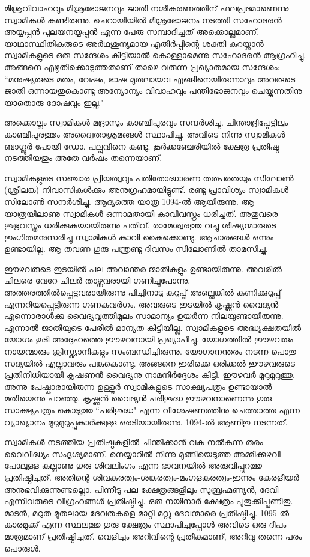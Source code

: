 \documentclass[12pt,openany]{book}
\begin{document}
	മിശ്രവിവാഹവും മിശ്രഭോജനവും ജാതി നശീകരണത്തിന് ഫലപ്രദമാണെന്നു സ്വാമികൾ കണ്ടിരുന്നു. ചെറായിയിൽ മിശ്രഭോജനം നടത്തി സഹോദരൻ അയ്യപ്പൻ പുലയനയ്യപ്പൻ എന്ന പേരു സമ്പാദിച്ചത് അക്കൊല്ലമാണ്. യാഥാസ്ഥിതികരുടെ അർഥശൂന്യമായ എതിർപ്പിന്റെ ശക്തി കുറയ്ക്കാൻ സ്വാമികളുടെ ഒരു സന്ദേശം കിട്ടിയാൽ കൊള്ളാമെന്നു സഹോദരൻ ആഗ്രഹിച്ചു. അങ്ങനെ എഴുതിക്കൊടുത്തതാണ് താഴെ വരുന്ന പ്രഖ്യാതമായ സന്ദേശം: ``മനുഷ്യരുടെ മതം, വേഷം, ഭാഷ മുതലായവ എങ്ങിനെയിരുന്നാലും അവരുടെ ജാതി ഒന്നായതുകൊണ്ടു അന്യോന്യം വിവാഹവും പന്തിഭോജനവും ചെയ്യുന്നതിനു യാതൊരു ദോഷവും ഇല്ല."
	
	അക്കൊല്ലം സ്വാമികൾ മദ്രാസും കാഞ്ചീപുരവും സന്ദർശിച്ചു. ചിന്താദ്രിപ്പേട്ടിലും കാഞ്ചീപുരത്തും അദ്വൈതാശ്രമങ്ങൾ സ്ഥാപിച്ചു. അവിടെ നിന്നു സ്വാമികൾ ബാഗ്ലൂർ പോയി ഡോ. പല്പുവിനെ കണ്ടു. കൂർക്കഞ്ചേരിയിൽ ക്ഷേത്ര പ്രതിഷ്ഠ നടത്തിയതും അതേ വർഷം തന്നെയാണ്.
	
	സ്വാമികളുടെ സഞ്ചാര പ്രിയത്വവും പതിതോദ്ധാരണ തത്പരതയും സിലോൺ (ശ്രീലങ്ക) നിവാസികൾക്കും അനുഗ്രഹമായിട്ടുണ്ട്. രണ്ടു പ്രാവിശ്യം സ്വാമികൾ സിലോൺ സന്ദർശിച്ചു. ആദ്യത്തെ യാത്ര 1094-ൽ ആയിരുന്നു. ആ യാത്രയിലാണു സ്വാമികൾ ഒന്നാമതായി കാവിവസ്ത്രം ധരിച്ചത്. അതുവരെ ശുഭ്രവസ്ത്രം ധരിക്കുകയായിരുന്നു പതിവ്. രാമേശ്വരത്തു വച്ചു ശിഷ്യന്മാരുടെ ഇംഗിതമനുസരിച്ചു സ്വാമികൾ കാവി കൈക്കൊണ്ടു. ആചാരങ്ങൾ ഒന്നും ഉണ്ടായില്ല. ആ തവണ ഗുരു പന്ത്രണ്ടു ദിവസം സിലോണിൽ താമസിച്ചു.
	
	ഈഴവരുടെ ഇടയിൽ പല അവാന്തര ജാതികളും ഉണ്ടായിരുന്നു. അവരിൽ ചിലരെ വേറേ ചിലർ താഴ്ന്നവരായി ഗണിച്ചുപോന്നു. അത്തരത്തിൽപ്പെട്ടവരായിരുന്നു പിച്ചിനാടു കുറുപ്പ് അല്ലെങ്കിൽ കണിക്കുറുപ്പ് എന്നറിയപ്പെട്ടിരുന്ന ഗണകവർഗം. അവരുടെ ഇടയിൽ കൃഷ്ണൻ വൈദ്യൻ എന്നൊരാൾക്കു വൈദ്യവൃത്തിമൂലം സാമാന്യം ഉയർന്ന നിലയുണ്ടായിരുന്നു. എന്നാൽ ജാതിയുടെ പേരിൽ മാന്യത കിട്ടിയില്ല. സ്വാമികളുടെ അദ്ധ്യക്ഷതയിൽ യോഗം കൂടി അദ്ദേഹത്തെ ഈഴവനായി പ്രഖ്യാപിച്ചു. യോഗത്തിൽ ഈഴവരും നായന്മാരും ക്രിസ്ത്യാനികളും സംബന്ധിച്ചിരുന്നു. യോഗാനന്തരം നടന്ന പൊതു സദ്യയിൽ എല്ലാവരും പങ്കുകൊണ്ടു. അങ്ങനെ ഇരിക്കെ ഒരിക്കൽ ഈഴവരുടെ പ്രതിനിധിയായി കൃഷണൻ വൈദ്യനു നാമനിർദ്ദേശം കിട്ടി. ഈഴവർ മുറുമുറുത്തു. അന്നു പേഷ്കാരായിരുന്ന ഉള്ളൂർ സ്വാമികളുടെ സാക്ഷ്യപത്രം ഉണ്ടായാൽ മതിയെന്നു പറഞ്ഞു. കൃഷ്ണൻ വൈദ്യൻ പരിശുദ്ധ ഈഴവനാണെന്നു ഗുരു സാക്ഷ്യപത്രം കൊടുത്തു ``പരിശുദ്ധ" എന്ന വിശേഷണത്തിനു ചെത്താത്ത എന്ന വ്യാഖ്യാനം മുറുമുറുപ്പുകാർക്കുള്ള ഒരടിയായിരുന്നു. 1094-ൽ ആണിതു നടന്നത്.
	
	സ്വാമികൾ നടത്തിയ പ്രതിഷ്ഠകളിൽ ചിന്തിക്കാൻ വക നൽകുന്ന തരം വൈവിദ്ധ്യം സംദൃശ്യമാണ്. നെയ്യാറിൽ നിന്നു മുങ്ങിയെടുത്ത അമ്മിക്കുഴവി പോലുള്ള കല്ലാണു ഗുരു ശിവലിംഗം എന്ന ഭാവനയിൽ അരുവിപ്പുറത്തു പ്രതിഷ്ഠിച്ചത്. അതിന്റെ ശിവകരത്വം-ശങ്കരത്വം-മംഗളകരത്വം-ഇന്നും കേരളീയർ അനുഭവിക്കുന്നുണ്ടല്ലൊ. പിന്നീടു പല ക്ഷേത്രങ്ങളിലും സുബ്രഹ്മണ്യൻ, ദേവി എന്നിവരുടെ വിഗ്രഹങ്ങൾ പ്രതിഷ്ഠിച്ചു. ഒരു നയിനാർ ക്ഷേത്രം പുതുക്കിപ്പണിതു. മാടൻ, മറുത മുതലായ ദേവതകളെ മാറ്റി മറ്റു ദേവന്മാരെ പ്രതിഷ്ഠിച്ചു. 1095-ൽ കാരമുക്ക് എന്ന സ്ഥലത്തു ഗുരു ക്ഷേത്രം സ്ഥാപിച്ചപ്പോൾ അവിടെ ഒരു ദീപം മാത്രമാണ് പ്രതിഷ്ഠിച്ചത്. വെളിച്ചം അറിവിന്റെ പ്രതീകമാണ്, അറിവു തന്നെ പരം പൊരുൾ.
	
\end{document}
